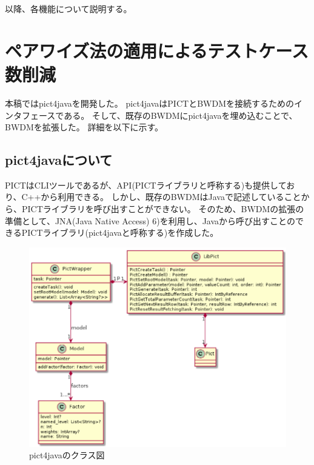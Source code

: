 \documentclass[uplatex, report, a4j, 10pt]{jsbook}
\begin{document}
以降、各機能について説明する。

\section{ペアワイズ法の適用によるテストケース数削減}
本稿ではpict4javaを開発した。
pict4javaはPICTとBWDMを接続するためのインタフェースである。
そして、既存のBWDMにpict4javaを埋め込むことで、BWDMを拡張した。
詳細を以下に示す。

\subsection{pict4javaについて}
PICTはCLIツールであるが、API(PICTライブラリと呼称する)も提供しており、C++から利用できる。
しかし、既存のBWDMはJavaで記述していることから、PICTライブラリを呼び出すことができない。
そのため、BWDMの拡張の準備として、JNA(Java Native Access) 6)を利用し、Javaから呼び出すことのできるPICTライブラリ(pict4javaと呼称する)を作成した。

\begin{figure}[tp]
  \centering
  \includegraphics[keepaspectratio, width=160mm]{figs/pict4java_class}
  \caption{pict4javaのクラス図}
  \label{fig:pict4javaClass}
\end{figure}
\end{document}

